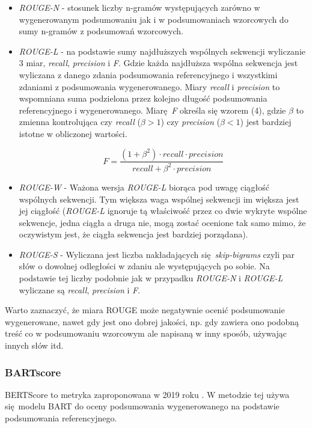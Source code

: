 \documentclass{article}
\begin{document}
\begin{itemize}
	\item \textit{ROUGE-N} - stosunek liczby n-gramów występujących zarówno w wygenerowanym podsumowaniu jak i w 
		podsumowaniach wzorcowych do sumy n-gramów z podsumowań wzorcowych.
	\item \textit{ROUGE-L} - na podstawie sumy najdłuższych wspólnych sekwencji wyliczanie 3 miar, 
		\textit{recall}, \textit{precision} i \textit{F}. Gdzie każda najdłuższa wspólna sekwencja jest
		wyliczana z danego zdania podsumowania referencyjnego i wszystkimi zdaniami z podsumowania wygenerowanego.
		Miary \textit{recall} i \textit{precision} to wspomniana suma podzielona przez kolejno długość podsumowania
		referencyjnego i wygenerowanego. Miarę \textit{F} określa się wzorem (4), gdzie $\beta$ to zmienna 
		kontrolująca czy \textit{recall} ($\beta > 1$) czy \textit{precision} ($\beta < 1$) jest bardziej 
		istotne w obliczonej wartości.
		\begin{center}
			\begin{equation}
				F = \frac{(1 + \beta^2) \cdot recall\cdot precision}{recall + \beta^2 \cdot precision}
			\end{equation}
		\end{center}
	\item \textit{ROUGE-W} - Ważona wersja \textit{ROUGE-L} biorąca pod uwagę
		ciągłość wspólnych sekwencji. Tym większa waga wspólnej sekwencji im większa jest jej ciągłość (\textit{ROUGE-L} ignoruje tą właściwość przez co dwie
		wykryte wspólne sekwencje, jedna ciągła a druga nie, mogą zostać ocenione
		tak samo mimo, że oczywistym jest, że ciągła sekwencja jest bardziej
		porządana).
	\item \textit{ROUGE-S} - Wyliczana jest liczba nakładających się \textit{skip-bigrams} 
		czyli par słów o dowolnej odległości w zdaniu ale występujących po sobie. Na podstawie tej 
		liczby podobnie jak w przypadku \textit{ROUGE-N} i \textit{ROUGE-L} wyliczane są
		\textit{recall}, \textit{precision} i \textit{F}.
\end{itemize}
Warto zaznaczyć, że miara ROUGE może negatywnie ocenić podsumowanie wygenerowane,
nawet gdy jest ono dobrej jakości, np. gdy zawiera ono podobną treść
co w podsumowaniu wzorcowym ale napisaną w inny sposób, używając innych słów itd.


\subsubsection{BARTscore}
BERTScore to metryka zaproponowana w 2019 roku \cite{zhang2020bertscoreevaluatingtextgeneration}. 
W metodzie tej używa się modelu BART do oceny podsumowania wygenerowanego na podstawie podsumowania
referencyjnego.
\end{document}
